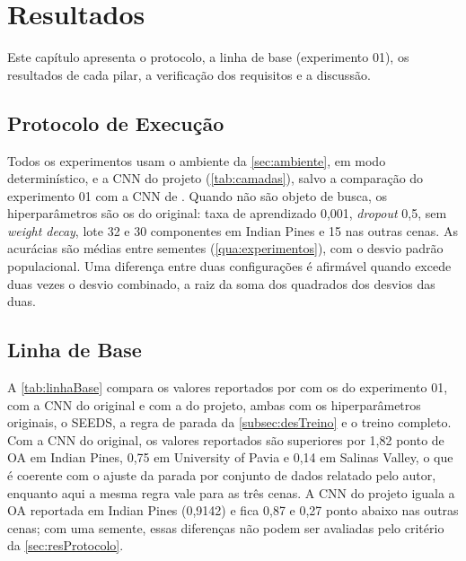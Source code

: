 \chapter{Resultados}
\label{cap:resultados}

Este capítulo apresenta o protocolo, a linha de base (experimento 01), os resultados de cada pilar, a verificação dos requisitos e a discussão.

\section{Protocolo de Execução}
\label{sec:resProtocolo}

Todos os experimentos usam o ambiente da \autoref{sec:ambiente}, em modo determinístico, e a CNN do projeto (\autoref{tab:camadas}), salvo a comparação do experimento 01 com a CNN de . Quando não são objeto de busca, os hiperparâmetros são os do original: taxa de aprendizado 0,001, \textit{dropout} 0,5, sem \textit{weight decay}, lote 32 e 30 componentes em Indian Pines e 15 nas outras cenas. As acurácias são médias entre sementes (\autoref{qua:experimentos}), com o desvio padrão populacional. Uma diferença entre duas configurações é afirmável quando excede duas vezes o desvio combinado, a raiz da soma dos quadrados dos desvios das duas.

\section{Linha de Base}
\label{sec:resLinhaBase}

A \autoref{tab:linhaBase} compara os valores reportados por  com os do experimento 01, com a CNN do original e com a do projeto, ambas com os hiperparâmetros originais, o SEEDS, a regra de parada da \autoref{subsec:desTreino} e o treino completo. Com a CNN do original, os valores reportados são superiores por 1,82 ponto de OA em Indian Pines, 0,75 em University of Pavia e 0,14 em Salinas Valley, o que é coerente com o ajuste da parada por conjunto de dados relatado pelo autor, enquanto aqui a mesma regra vale para as três cenas. A CNN do projeto iguala a OA reportada em Indian Pines (0,9142) e fica 0,87 e 0,27 ponto abaixo nas outras cenas; com uma semente, essas diferenças não podem ser avaliadas pelo critério da \autoref{sec:resProtocolo}.

